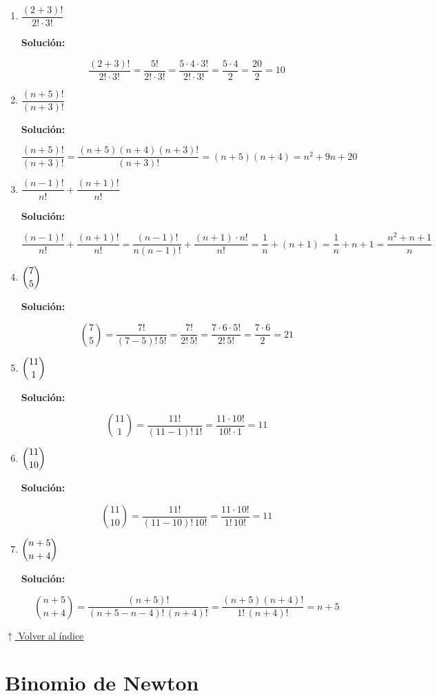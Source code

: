 \documentclass[12pt]{article}
\newcommand{\solucion}{%
    \vspace{0.8em}%
    \textbf{Solución:}%
}
\newcommand{\volverindice}{%
    \vspace{1em}%
    \begin{flushright}%
        \hyperlink{indice}{\small $\uparrow$ Volver al índice}%
    \end{flushright}%
}
\begin{document}
\begin{enumerate}[label=\alph*.-]
    \item $\dfrac{(2+3)!}{2!\cdot3!}$

    \solucion
    \[
    \frac{(2+3)!}{2!\cdot3!} = \frac{5!}{2!\cdot3!} = \frac{5\cdot4\cdot3!}{2!\cdot3!}
    = \frac{5\cdot4}{2} = \frac{20}{2} = 10
    \]

    \item $\dfrac{(n+5)!}{(n+3)!}$

    \solucion
    \[
    \frac{(n+5)!}{(n+3)!} = \frac{(n+5)(n+4)(n+3)!}{(n+3)!}
    = (n+5)(n+4) = n^2+9n+20
    \]

    \item $\dfrac{(n-1)!}{n!}+\dfrac{(n+1)!}{n!}$

    \solucion
    \[
    \frac{(n-1)!}{n!}+\frac{(n+1)!}{n!}
    = \frac{(n-1)!}{n(n-1)!}+\frac{(n+1)\cdot n!}{n!}
    = \frac{1}{n}+(n+1)
    = \frac{1}{n}+n+1
    = \frac{n^2+n+1}{n}
    \]

    \item $\dbinom{7}{5}$

    \solucion
    \[
    \binom{7}{5} = \frac{7!}{(7-5)!\,5!} = \frac{7!}{2!\,5!}
    = \frac{7\cdot6\cdot5!}{2!\,5!} = \frac{7\cdot6}{2} = 21
    \]

    \item $\dbinom{11}{1}$

    \solucion
    \[
    \binom{11}{1} = \frac{11!}{(11-1)!\,1!} = \frac{11\cdot10!}{10!\cdot1} = 11
    \]

    \item $\dbinom{11}{10}$

    \solucion
    \[
    \binom{11}{10} = \frac{11!}{(11-10)!\,10!} = \frac{11\cdot10!}{1!\,10!} = 11
    \]

    \newpage
    \item $\dbinom{n+5}{n+4}$

    \solucion
    \[
    \binom{n+5}{n+4} = \frac{(n+5)!}{(n+5-n-4)!\,(n+4)!}
    = \frac{(n+5)(n+4)!}{1!\,(n+4)!} = n+5
    \]

\end{enumerate}

\volverindice
\newpage

\section{Binomio de Newton}
\end{document}
